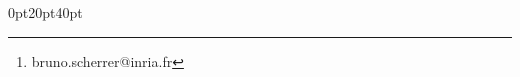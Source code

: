 \usepackage[utf8]{inputenc}  
\usepackage[T1]{fontenc}
\usepackage[french]{babel}
\usepackage{adjustbox}

\usepackage[landscape,left=1cm,top=1.5cm,right=1cm,bottom=1.5cm]{geometry}

\usepackage{fancyhdr}
\usepackage{multicol}
\usepackage{hyperref}
\usepackage{eurosym}
\usepackage{graphicx}
\usepackage[dvipsnames]{xcolor}

\usepackage{tocloft}
\usepackage{etoc}


\cftsubsubsecindent 0pt
\cftsubsecindent 0pt
\cftsecindent 0pt
\cftparaindent 0pt

\usepackage{titlesec}
\titleformat{\chapter}[display]
{\normalfont\huge\bfseries}{}{0pt}{\Huge}
\titlespacing*{\chapter} {0pt}{20pt}{40pt}

\title{\titre}
\author{Bruno Scherrer\footnote{bruno.scherrer@inria.fr}}
\date{\today}


\setcounter{secnumdepth}{4} %

\titlespacing*{\chapter}{0pt}{-50pt}{40pt}
